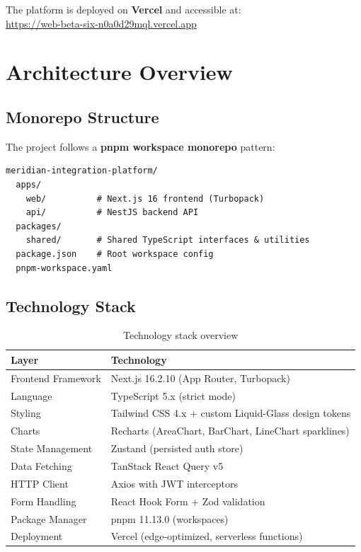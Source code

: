 \documentclass[12pt,a4paper]{article}
\begin{document}
The platform is deployed on \textbf{Vercel} and accessible at:\\
\url{https://web-beta-six-n0a0d29mql.vercel.app}

\section{Architecture Overview}

\subsection{Monorepo Structure}

The project follows a \textbf{pnpm workspace monorepo} pattern:

\begin{lstlisting}[style=code]
meridian-integration-platform/
  apps/
    web/          # Next.js 16 frontend (Turbopack)
    api/          # NestJS backend API
  packages/
    shared/       # Shared TypeScript interfaces & utilities
  package.json    # Root workspace config
  pnpm-workspace.yaml
\end{lstlisting}

\subsection{Technology Stack}

\begin{table}[H]
\centering
\begin{tabularx}{\textwidth}{lX}
\toprule
\textbf{Layer} & \textbf{Technology} \\
\midrule
Frontend Framework & Next.js 16.2.10 (App Router, Turbopack) \\
Language           & TypeScript 5.x (strict mode) \\
Styling            & Tailwind CSS 4.x + custom Liquid-Glass design tokens \\
Charts             & Recharts (AreaChart, BarChart, LineChart sparklines) \\
State Management   & Zustand (persisted auth store) \\
Data Fetching      & TanStack React Query v5 \\
HTTP Client        & Axios with JWT interceptors \\
Form Handling      & React Hook Form + Zod validation \\
Package Manager    & pnpm 11.13.0 (workspaces) \\
Deployment         & Vercel (edge-optimized, serverless functions) \\
\bottomrule
\end{tabularx}
\caption{Technology stack overview}
\end{table}
\end{document}
